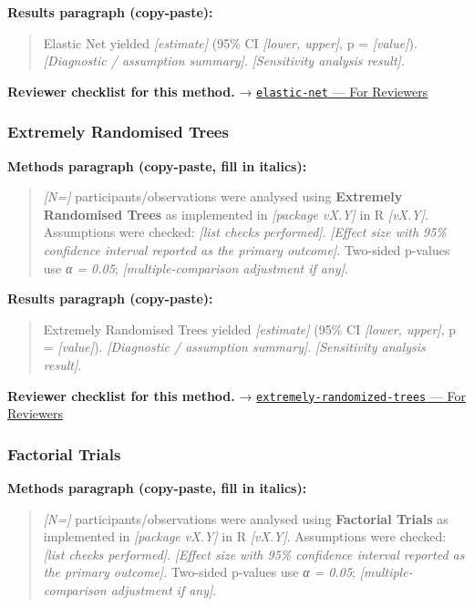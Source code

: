 \documentclass[
]{article}
\begin{document}
\textbf{Results paragraph (copy-paste):}

\begin{quote}
Elastic Net yielded \emph{{[}estimate{]}} (95\% CI \emph{{[}lower,
upper{]}}, p = \emph{{[}value{]}}). \emph{{[}Diagnostic / assumption
summary{]}}. \emph{{[}Sensitivity analysis result{]}}.
\end{quote}

\textbf{Reviewer checklist for this method.} →
\href{../chapters/07-regression/elastic-net.Rmd\#for-reviewers}{\texttt{elastic-net}
--- For Reviewers}

\subsubsection{Extremely Randomised
Trees}\label{extremely-randomised-trees}

\textbf{Methods paragraph (copy-paste, fill in italics):}

\begin{quote}
\emph{{[}N={]}} participants/observations were analysed using
\textbf{Extremely Randomised Trees} as implemented in \emph{{[}package
vX.Y{]}} in R \emph{{[}vX.Y{]}}. Assumptions were checked: \emph{{[}list
checks performed{]}}. \emph{{[}Effect size with 95\% confidence interval
reported as the primary outcome{]}}. Two-sided p-values use \emph{α =
0.05}; \emph{{[}multiple-comparison adjustment if any{]}}.
\end{quote}

\textbf{Results paragraph (copy-paste):}

\begin{quote}
Extremely Randomised Trees yielded \emph{{[}estimate{]}} (95\% CI
\emph{{[}lower, upper{]}}, p = \emph{{[}value{]}}). \emph{{[}Diagnostic
/ assumption summary{]}}. \emph{{[}Sensitivity analysis result{]}}.
\end{quote}

\textbf{Reviewer checklist for this method.} →
\href{../chapters/13-ml/extremely-randomized-trees.Rmd\#for-reviewers}{\texttt{extremely-randomized-trees}
--- For Reviewers}

\subsubsection{Factorial Trials}\label{factorial-trials}

\textbf{Methods paragraph (copy-paste, fill in italics):}

\begin{quote}
\emph{{[}N={]}} participants/observations were analysed using
\textbf{Factorial Trials} as implemented in \emph{{[}package vX.Y{]}} in
R \emph{{[}vX.Y{]}}. Assumptions were checked: \emph{{[}list checks
performed{]}}. \emph{{[}Effect size with 95\% confidence interval
reported as the primary outcome{]}}. Two-sided p-values use \emph{α =
0.05}; \emph{{[}multiple-comparison adjustment if any{]}}.
\end{quote}
\end{document}
